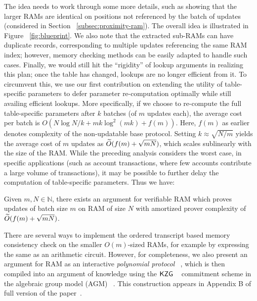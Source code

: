 The idea needs to work through some more details, such as showing that the larger RAMs are identical
on positions not referenced by the batch of updates (considered in Section ~\ref{subsec:proximity-ram}).
The overall idea is illustrated in Figure ~\ref{fig:blueprint}. We also note that the extracted sub-RAMs can
have duplicate records, corresponding to multiple updates referencing the same RAM index; however, memory
checking methods can be easily adapted to handle such cases. Finally, we would still hit the ``rigidity'' of lookup arguments
in realizing this plan; once the table has changed, lookups are no longer efficient from it. To circumvent this,
we use our first contribution on extending the utility of table-specific parameters to defer parameter
re-computation optimally while still availing efficient lookups. More specifically, if we choose to
re-compute the full table-specific parameters after $k$ batches (of $m$ updates each),
the average cost per batch is $O(N\log N/k + mk\log^2(mk) + f(m))$. Here, $f(m)$ as earlier denotes complexity
of the non-updatable base protocol. Setting $k\approx \sqrt{N/m}$ yields the average cost of $m$ updates as $\widetilde{O}(f(m)+\sqrt{mN})$,
which scales sublinearly with the size of the RAM.
While the preceding analysis considers the worst case,
in specific applications (such as account transactions, where few accounts contribute a large volume of transactions), it may be
possible to further delay the computation of table-specific parameters.
Thus we have:
\begin{theorem}[Informal]\label{thm:inc-ver-ram-informal}
	Given $m,N\in \mathbb{N}$, there exists an argument for verifiable RAM which proves updates of batch size $m$ on RAM of size $N$
	with amortized prover complexity of $\widetilde{O}(f(m) + \sqrt{mN})$.
\end{theorem}


 There are several ways to implement the ordered transcript based
memory consistency check on the smaller $O(m)$-sized RAMs, for example by expressing the same as an arithmetic
circuit. However, for completeness, we also present an argument for RAM as an
interactive {\em polynomial protocol} ~\cite{Gabizon2019PLONKPO}, which is then compiled into an argument of knowledge using the $\mathsf{KZG}$ ~\cite{AC:KatZavGol10}
commitment scheme in the algebraic group model (AGM) ~\cite{C:FucKilLos18}. This construction appears in
Appendix B of full version of the paper~\cite{full-ver}. %

